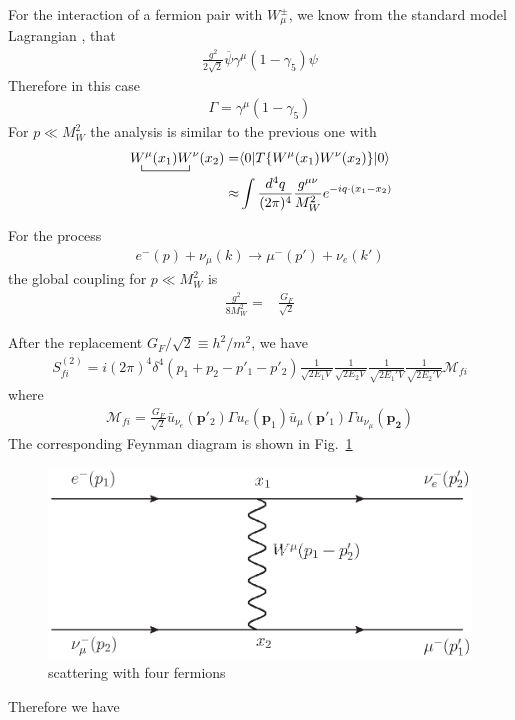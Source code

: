 For the interaction of a fermion pair with $W_\mu^\pm$, we know from
the standard model Lagrangian \cite{lsm}, that
\begin{align}
  \frac{g^2}{2\sqrt{2}}\overline{\psi}\gamma^\mu(1-\gamma_5)\psi
\end{align}
Therefore in this case
\begin{align}
  \Gamma=\gamma^\mu(1-\gamma_5)
\end{align}
For $p\ll M_W^2$ the analysis is similar to the previous one with
\begin{align}
   \bcontraction{\,}{W^\mu}{(x_1)}{W^\nu}
\,W^\mu(x_1)W^\nu(x_2)=&\langle0|T\{W^\mu(x_1)W^\nu(x_2)\}|0\rangle\nonumber\\
\approx&\int\frac{d^4q}{(2\pi)^4}\frac{g^{\mu\nu}}{M_W^2}e^{-i q\cdot(x_1-x_2)}
\end{align}

For the process 
\begin{align}
  e^-(p)+\nu_\mu(k)\to\mu^-(p')+\nu_e(k')
\end{align}
the global coupling for $p\ll M_W^2$ is
\begin{align}
  \frac{g^2}{8M_W^2}=&\frac{G_F}{\sqrt{2}}
\end{align}

After the replacement $G_F/\sqrt{2}\equiv h^2/m^2$, we have
\begin{align}
  \label{eq:101f}
  S^{(2)}_{fi}=i(2\pi)^4\delta^{4}\left(p_1+p_2-p'_1-p'_2\right)
  \frac{1}{\sqrt{2E_1 V}}\frac{1}{\sqrt{2E_2 V}}
  \frac{1}{\sqrt{2E_1' V}}\frac{1}{\sqrt{2E_2' V}}
  \mathcal{M}_{fi}
\end{align}
where
\begin{align}
  \mathcal{M}_{fi}=\frac{G_F}{\sqrt{2}}
\bar{u}_{\nu_e}(\mathbf{p}'_2)\Gamma u_e(\mathbf{p}_1)\bar{u}_\mu(\mathbf{p}'_1)\Gamma u_{\nu_\mu}(\mathbf{p_2})
\end{align}
The corresponding Feynman diagram is shown in Fig.~\ref{fig:sw}
\begin{figure} %
  \centering %
  \includegraphics{scatteringw} %
  \caption{scattering with four fermions} %
  \label{fig:sw} %
\end{figure} %
Therefore we have

